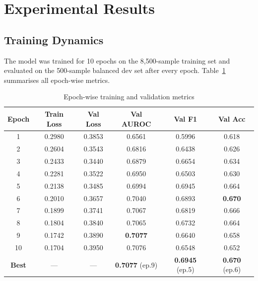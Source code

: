 \documentclass[12pt,a4paper]{article}
\begin{document}
\section{Experimental Results}

\subsection{Training Dynamics}

The model was trained for 10 epochs on the 8,500-sample training set and evaluated on the 500-sample balanced dev set after every epoch. Table~\ref{tab:results} summarises all epoch-wise metrics.

\begin{table}[H]
  \centering
  \caption{Epoch-wise training and validation metrics}
  \renewcommand{\arraystretch}{1.3}
  \begin{tabular}{cccccc}
    \toprule
    \rowcolor{primaryblue!15}
    \textbf{Epoch} & \textbf{Train Loss} & \textbf{Val Loss} & \textbf{Val AUROC} & \textbf{Val F1} & \textbf{Val Acc} \\
    \midrule
    1  & 0.2980 & 0.3853 & 0.6561 & 0.5996 & 0.618 \\
    2  & 0.2604 & 0.3543 & 0.6816 & 0.6438 & 0.626 \\
    3  & 0.2433 & 0.3440 & 0.6879 & 0.6654 & 0.634 \\
    4  & 0.2281 & 0.3522 & 0.6950 & 0.6503 & 0.630 \\
    5  & 0.2138 & 0.3485 & 0.6994 & 0.6945 & 0.664 \\
    6  & 0.2010 & 0.3657 & 0.7040 & 0.6893 & \cellcolor{successgreen!20}\textbf{0.670} \\
    7  & 0.1899 & 0.3741 & 0.7067 & 0.6819 & 0.666 \\
    8  & 0.1804 & 0.3840 & 0.7065 & 0.6732 & 0.664 \\
    9  & 0.1742 & 0.3890 & \cellcolor{successgreen!20}\textbf{0.7077} & 0.6640 & 0.658 \\
    10 & 0.1704 & 0.3950 & 0.7076 & 0.6548 & 0.652 \\
    \midrule
    \rowcolor{primaryblue!10}
    \textbf{Best} & --- & --- & \textbf{0.7077} (ep.9) & \textbf{0.6945} (ep.5) & \textbf{0.670} (ep.6) \\
    \bottomrule
  \end{tabular}
  \label{tab:results}
\end{table}
\end{document}
